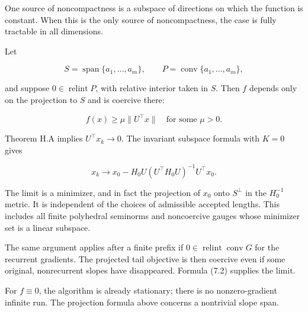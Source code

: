 One source of noncompactness is a subspace of directions on which the
function is constant. When this is the only source of noncompactness,
the case is fully tractable in all dimensions.

Let

\[
S=\operatorname{span}\{a_1,\ldots,a_m\},\qquad
P=\operatorname{conv}\{a_1,\ldots,a_m\},
\]

and suppose \(0\in\operatorname{relint}P\), with relative interior taken
in \(S\). Then \(f\) depends only on the projection to \(S\) and is
coercive there:

\[
f(x)\ge\mu\|U^\top x\|\quad\text{for some }\mu>0.
\]

Theorem H.A implies \(U^\top x_k\to0\). The invariant subspace formula
with \(K=0\) gives

\[
\boxed{
x_k\longrightarrow
x_0-H_0U(U^\top H_0U)^{-1}U^\top x_0.
}
\tag{H.8.1}
\]

The limit is a minimizer, and in fact the projection of \(x_0\) onto
\(S^\perp\) in the \(H_0^{-1}\) metric. It is independent of the choices
of admissible accepted lengths. This includes all finite polyhedral
seminorms and noncoercive gauges whose minimizer set is a linear
subspace.

The same argument applies after a finite prefix if
\(0\in\operatorname{relint}\operatorname{conv}G\) for the recurrent
gradients. The projected tail objective is then coercive even if some
original, nonrecurrent slopes have disappeared. Formula (7.2) supplies
the limit.

For \(f\equiv0\), the algorithm is already stationary; there is no
nonzero-gradient infinite run. The projection formula above concerns a
nontrivial slope span.


\endgroup
